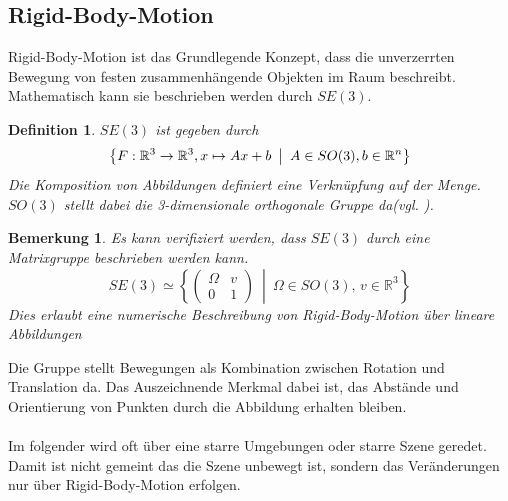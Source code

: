 \documentclass[12pt,DIV=15,BCOR=15mm,twoside,headsepline,abstract=true,listof=totoc,bibliography=totoc]{scrreprt}
\newtheorem{remark}{Bemerkung}[chapter]
\newtheorem{defi}{Definition}
\theoremstyle{remark}    %
\begin{document}
    \subsection{Rigid-Body-Motion}
    Rigid-Body-Motion ist das Grundlegende Konzept, dass die unverzerrten Bewegung von festen zusammenhängende Objekten im Raum beschreibt. 
    Mathematisch kann sie beschrieben werden durch $SE(3)$. \cite{Murray1994}
    \begin{defi}
        $SE(3)$ ist gegeben durch 
        \begin{equation}
            \left\{F: \mathbb{R}^3 \to \mathbb{R}^3, x \mapsto Ax + b \hspace{0.5em} \middle| \hspace{0.5em} A \in SO(3), b \in \mathbb{R}^n\right\}
        \end{equation}
        Die Komposition von Abbildungen definiert eine Verknüpfung auf der Menge. $SO(3)$ stellt dabei die 3-dimensionale orthogonale Gruppe da(vgl. \cite{Murray1994}).
    \end{defi}
    \begin{remark}
    Es kann verifiziert werden, dass $SE(3)$ durch eine Matrixgruppe beschrieben werden kann. \[
        SE(3)  \simeq 
            \left\{
            \begin{pmatrix}
            \Omega & v \\[3pt]
            0 & 1
            \end{pmatrix}
            \ \middle|\ 
            \Omega \in SO(3),\, v \in \mathbb{R}^3
            \right\}
    \]Dies erlaubt eine numerische Beschreibung von Rigid-Body-Motion über lineare Abbildungen \cite{Murray1994}
    \end{remark} \noindent
    Die Gruppe stellt Bewegungen als Kombination zwischen Rotation und Translation da. Das Auszeichnende Merkmal dabei ist, das Abstände und Orientierung von Punkten
    durch die Abbildung erhalten bleiben.\cite{Murray1994}\\\\
    Im folgender wird oft über eine starre Umgebungen oder starre Szene geredet. Damit ist nicht gemeint das die Szene unbewegt ist, sondern 
    das Veränderungen nur über Rigid-Body-Motion erfolgen.
\end{document}
